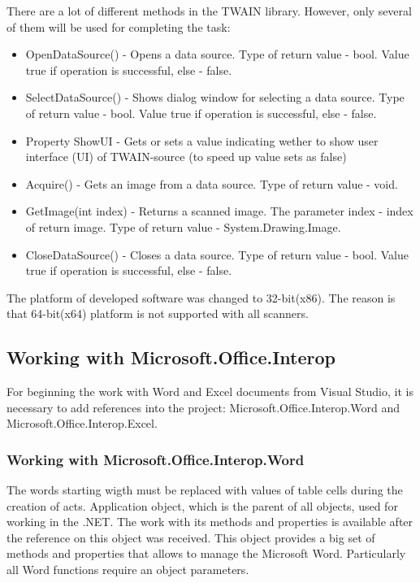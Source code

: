 \documentclass[12pt,journal,compsoc]{D:/Магистратура/English/bare_conf/IEEEtran}
\begin{document}
There are a lot of different methods in the TWAIN library. However, only several of them will be used for completing the task:
\begin{itemize}
\item OpenDataSource() - Opens a data source. Type of return value - bool. Value true if operation is successful, else - false. 
\item SelectDataSource() - Shows dialog window for selecting a data source. Type of return value - bool. Value true if operation is successful, else - false.
\item Property ShowUI - Gets or sets a value indicating wether to show user interface (UI) of TWAIN-source (to speed up value sets as false)
\item Acquire() - Gets an image from a data source. Type of return value - void. 
\item GetImage(int index) - Returns a scanned image. The parameter index - index of return image. Type of return value - System.Drawing.Image. 
\item CloseDataSource() - Closes a data source. Type of return value - bool. Value true if operation is successful, else - false.
\end{itemize}

The platform of developed software was changed to 32-bit(x86). The reason is that 64-bit(x64) platform is not supported with all scanners.

\subsection{Working with Microsoft.Office.Interop}
For beginning the work with Word and Excel documents from Visual Studio, it is necessary to add references into the project: Microsoft.Office.Interop.Word and Microsoft.Office.Interop.Excel. 

\subsubsection{Working with Microsoft.Office.Interop.Word}
The words starting wigth \@ must be replaced with values of table cells during the creation of acts. Application object, which is the parent of all objects, used for working  in the .NET. The work with its methods and properties is available after the reference on this object was received. This object provides a big set of methods and properties that allows to manage the Microsoft Word. Particularly all Word functions require an object parameters.
\end{document}
